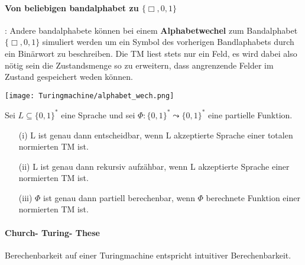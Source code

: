 {
    }

    \newpage
      
    \paragraph{Von beliebigen bandalphabet zu \(\{\Box, 0, 1\}\)}: Andere bandalphabete können bei einem \textbf{Alphabetwechel} zum Bandalphabet \(\{\Box, 0, 1\}\) simuliert werden um ein Symbol des vorherigen Bandlaphabets durch ein Binärwort zu beschreiben. Die TM liest stets nur ein Feld, es wird dabei also nötig sein die Zustandsmenge so zu erweitern, dass angrenzende Felder im Zustand gespeichert weden können.
    
    \usetikzlibrary{arrows, positioning, calc}
    {

    \texttt{[image: Turingmachine/alphabet\_wech.png]}

    }
    
  Sei \(L \subseteq \{0, 1\}^*\) eine Sprache und sei \(\Phi : \{0, 1\}^* \leadsto \{0, 1\}^*\) eine partielle Funktion.
  \begin{itemize}
    \item [(i)] L ist genau dann entscheidbar, wenn L akzeptierte Sprache einer totalen normierten TM ist. 
    \item [(ii)] L ist genau dann rekursiv aufzähbar, wenn L akzeptierte Sprache einer normierten TM ist.
    \item [(iii)] \(\Phi\) ist genau dann partiell berechenbar, wenn \(\Phi\) berechnete Funktion einer normierten TM ist.
  \end{itemize}

\paragraph*{Church- Turing- These} 
  Berechenbarkeit auf einer Turingmachine entspricht intuitiver Berechenbarkeit.
